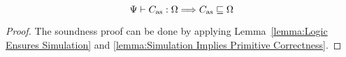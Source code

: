 \begin{theorem}
    \em
    \label{thm:logic soundness}
    \[
        {\Psi} \vdash {C_{\text{as}}} : {\Omega} \Longrightarrow
        C_{\text{as}} \sqsubseteq \Omega
    \]
\end{theorem}
\begin{proof}
    The soundness proof can be done by applying
    Lemma~\ref{lemma:Logic Ensures Simulation} and
    \ref{lemma:Simulation Implies Primitive Correctness}.
\end{proof}



